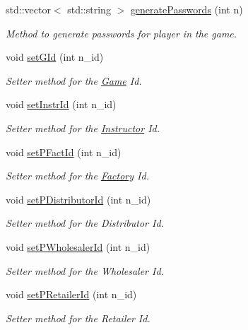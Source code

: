 \begin{DoxyCompactItemize}
std\+::vector$<$ std\+::string $>$ \hyperlink{class_game_aa083541e01feec6694497e8c6eb5ffe8}{generate\+Passwords} (int n)
\begin{DoxyCompactList}\small\item\em Method to generate passwords for player in the game. \end{DoxyCompactList}\item 
void \hyperlink{class_game_a4216dd9e4b966f68cebcd4914a203edb}{set\+G\+Id} (int n\+\_\+id)
\begin{DoxyCompactList}\small\item\em Setter method for the \hyperlink{class_game}{Game} Id. \end{DoxyCompactList}\item 
void \hyperlink{class_game_a7a704228c549b80d48d1b4fb5a8dd512}{set\+Instr\+Id} (int n\+\_\+id)
\begin{DoxyCompactList}\small\item\em Setter method for the \hyperlink{class_instructor}{Instructor} Id. \end{DoxyCompactList}\item 
void \hyperlink{class_game_a727c19b36849f11e1e08d05af9162388}{set\+P\+Fact\+Id} (int n\+\_\+id)
\begin{DoxyCompactList}\small\item\em Setter method for the \hyperlink{class_factory}{Factory} Id. \end{DoxyCompactList}\item 
void \hyperlink{class_game_a98cdfae7d20ad4c4f7a34ed56e64ab7c}{set\+P\+Distributor\+Id} (int n\+\_\+id)
\begin{DoxyCompactList}\small\item\em Setter method for the Distributor Id. \end{DoxyCompactList}\item 
void \hyperlink{class_game_a945968b2490656de58ce89b653eb30e8}{set\+P\+Wholesaler\+Id} (int n\+\_\+id)
\begin{DoxyCompactList}\small\item\em Setter method for the Wholesaler Id. \end{DoxyCompactList}\item 
void \hyperlink{class_game_a80b5a91e9262403dfac82f961056c79a}{set\+P\+Retailer\+Id} (int n\+\_\+id)
\begin{DoxyCompactList}\small\item\em Setter method for the Retailer Id. \end{DoxyCompactList}\item 

\end{DoxyCompactItemize}
